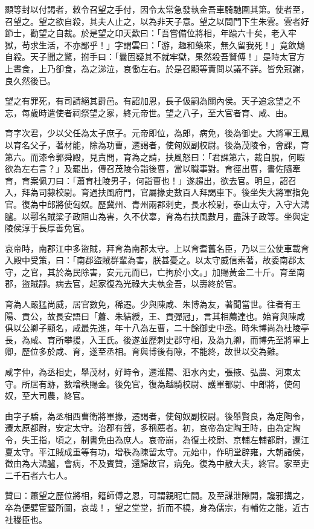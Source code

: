 \begin{pinyinscope}
顯等封以付謁者，敕令召望之手付，因令太常急發執金吾車騎馳圍其第。使者至，召望之。望之欲自殺，其夫人止之，以為非天子意。望之以問門下生朱雲。雲者好節士，勸望之自裁。於是望之卬天歎曰：「吾嘗備位將相，年踰六十矣，老入牢獄，苟求生活，不亦鄙乎！」字謂雲曰：「游，趣和藥來，無久留我死！」竟飲鴆自殺。天子聞之驚，拊手曰：「曩固疑其不就牢獄，果然殺吾賢傅！」是時太官方上晝食，上乃卻食，為之涕泣，哀慟左右。於是召顯等責問以議不詳。皆免冠謝，良久然後已。

望之有罪死，有司請絕其爵邑。有詔加恩，長子伋嗣為關內侯。天子追念望之不忘，每歲時遣使者祠祭望之冢，終元帝世。望之八子，至大官者育、咸、由。

育字次君，少以父任為太子庶子。元帝即位，為郎，病免，後為御史。大將軍王鳳以育名父子，著材能，除為功曹，遷謁者，使匈奴副校尉。後為茂陵令，會課，育第六。而漆令郭舜殿，見責問，育為之請，扶風怒曰：「君課第六，裁自脫，何暇欲為左右言？」及罷出，傳召茂陵令詣後曹，當以職事對。育徑出曹，書佐隨牽育，育案佩刀曰：「蕭育杜陵男子，何詣曹也！」遂趨出，欲去官。明旦，詔召入，拜為司隸校尉。育過扶風府門，官屬掾史數百人拜謁車下。後坐失大將軍指免官。復為中郎將使匈奴。歷冀州、青州兩郡刺史，長水校尉，泰山太守，入守大鴻臚。以鄠名賊梁子政阻山為害，久不伏辜，育為右扶風數月，盡誅子政等。坐與定陵侯淳于長厚善免官。

哀帝時，南郡江中多盜賊，拜育為南郡太守。上以育耆舊名臣，乃以三公使車載育入殿中受策，曰：「南郡盜賊群輩為害，朕甚憂之。以太守威信素著，故委南郡太守，之官，其於為民除害，安元元而已，亡拘於小文。」加賜黃金二十斤。育至南郡，盜賊靜。病去官，起家復為光祿大夫執金吾，以壽終於官。

育為人嚴猛尚威，居官數免，稀遷。少與陳咸、朱博為友，著聞當世。往者有王陽、貢公，故長安語曰「蕭、朱結綬，王、貢彈冠」，言其相薦達也。始育與陳咸俱以公卿子顯名，咸最先進，年十八為左曹，二十餘御史中丞。時朱博尚為杜陵亭長，為咸、育所攀援，入王氏。後遂並歷刺史郡守相，及為九卿，而博先至將軍上卿，歷位多於咸、育，遂至丞相。育與博後有隙，不能終，故世以交為難。

咸字仲，為丞相史，舉茂材，好畤令，遷淮陽、泗水內史，張掖、弘農、河東太守。所居有跡，數增秩賜金。後免官，復為越騎校尉、護軍都尉、中郎將，使匈奴，至大司農，終官。

由字子驕，為丞相西曹衛將軍掾，遷謁者，使匈奴副校尉。後舉賢良，為定陶令，遷太原都尉，安定太守。治郡有聲，多稱薦者。初，哀帝為定陶王時，由為定陶令，失王指，頃之，制書免由為庶人。哀帝崩，為復土校尉、京輔左輔都尉，遷江夏太守。平江賊成重等有功，增秩為陳留太守。元始中，作明堂辟雍，大朝諸侯，徵由為大鴻臚，會病，不及賓贊，還歸故官，病免。復為中散大夫，終官。家至吏二千石者六七人。

贊曰：蕭望之歷位將相，籍師傅之恩，可謂親昵亡間。及至謀泄隙開，讒邪搆之，卒為便嬖宦豎所圖，哀哉！，望之堂堂，折而不橈，身為儒宗，有輔佐之能，近古社稷臣也。


\end{pinyinscope}